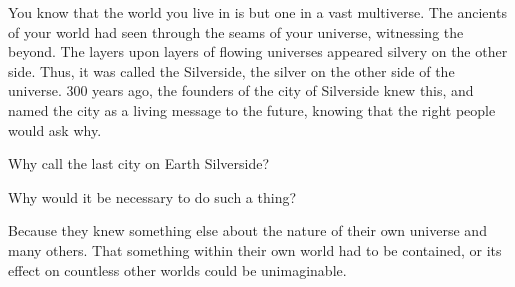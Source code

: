 \documentclass[blue]{Silversiders}
\begin{document}
\name{\bSilverside{}}

You know that the world you live in is but one in a vast multiverse. The ancients of your world had seen through the seams of your universe, witnessing the beyond. The layers upon layers of flowing universes appeared silvery on the other side. Thus, it was called the Silverside, the silver on the other side of the universe. 300 years ago, the founders of the city of Silverside knew this, and named the city as a living message to the future, knowing that the right people would ask why. 

Why call the last city on Earth Silverside?

Why would it be necessary to do such a thing?

Because they knew something else about the nature of their own universe and many others. That something within their own world had to be contained, or its effect on countless other worlds could be unimaginable.
\end{document}
